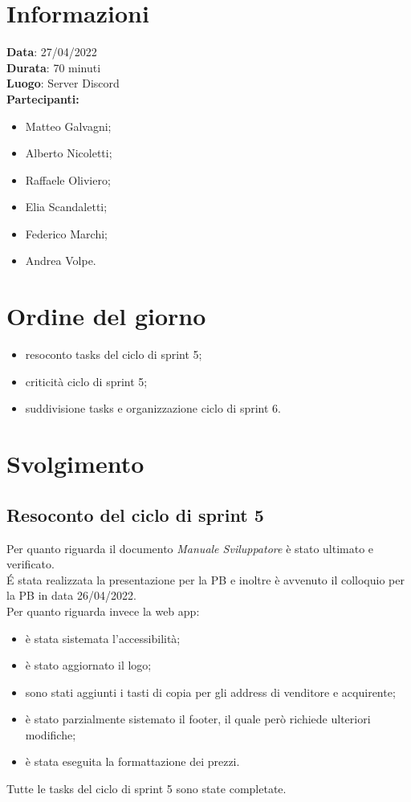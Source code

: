 \documentclass[a4paper, 12pt]{article}
\begin{document}
\makefrontpage

\section{Informazioni}
\textbf{Data}: 27/04/2022\\
\textbf{Durata}: 70 minuti\\
\textbf{Luogo}: Server Discord\\

\textbf{Partecipanti:}
\begin{itemize}
	\item Matteo Galvagni;
	\item Alberto Nicoletti;
	\item Raffaele Oliviero;
	\item Elia Scandaletti;
  \item Federico Marchi;
	\item Andrea Volpe.
\end{itemize}


\section{Ordine del giorno}
\begin{itemize}
	\item resoconto tasks del ciclo di sprint 5;
  \item criticità ciclo di sprint 5;
	\item suddivisione tasks e organizzazione ciclo di sprint 6.
\end{itemize}

\section{Svolgimento}

\subsection{Resoconto del ciclo di sprint 5}
Per quanto riguarda il documento \textit{Manuale Sviluppatore} è stato ultimato e verificato.\\
É stata realizzata la presentazione per la PB e inoltre è avvenuto il colloquio per la PB in data 26/04/2022.\\
Per quanto riguarda invece la web app:
\begin{itemize}
  \item è stata sistemata l'accessibilità;
  \item è stato aggiornato il logo;
  \item sono stati aggiunti i tasti di copia per gli address di venditore e acquirente;
  \item è stato parzialmente sistemato il footer, il quale però richiede ulteriori modifiche;
  \item è stata eseguita la formattazione dei prezzi.
\end{itemize}
Tutte le tasks del ciclo di sprint 5 sono state completate.
\end{document}
